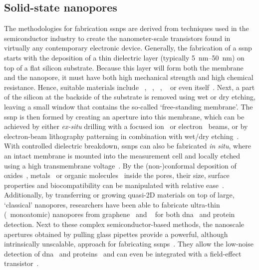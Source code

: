 \subsection{Solid-state nanopores}
%

The methodologies for fabrication \glspl{ssnp} are derived from techniques used in the semiconductor industry
to create the nanometer-scale transistors found in virtually any contemporary electronic device. Generally,
the fabrication of a \gls{ssnp} starts with the deposition of a thin dielectric layer (typically
\SIrange{5}{50}{\nm}) on top of a flat silicon substrate. Because this layer will form both the membrane and
the nanopore, it must have both high mechanical strength and high chemical resistance. Hence, suitable
materials include ~\cite{Li-2001,Storm-2003}, ~\cite{Storm-2005},
~\cite{Venkatesan-2009}, ~\cite{Larkin-2013} or even 
itself~\cite{Malachowski-2013}. Next, a part of the silicon at the backside of the substrate is removed using
wet or dry etching, leaving a small window that contains the so-called `free-standing membrane'. The \gls{ssnp}
is then formed by creating an aperture into this membrane, which can be achieved by either \textit{ex-situ}
drilling with a focused ion~\cite{Li-2001} or electron~\cite{Storm-2003} beams, or by electron-beam
lithography patterning in combination with wet/dry etching~\cite{Nam-2009}. With controlled dielectric
breakdown, \glspl{ssnp} can also be fabricated \textit{in situ}, where an intact membrane is mounted into the
measurement cell and locally etched using a high transmembrane voltage~\cite{Kwok-2014}. By the
(non-)conformal deposition of oxides~\cite{Chen-2004}, metals~\cite{Li-2013d,Auger-2014,Spitzberg-2019} or
organic molecules~\cite{Wanunu-2007,Yusko-2011,Wei-2012,Rotem-2012} inside the pores, their size, surface
properties and biocompatibility can be manipulated with relative ease~\cite{Eggenberger-2019}. Additionally,
by transferring or growing quasi-2D materials on top of large, `classical' nanopores, researchers have been
able to fabricate ultra-thin (\ie~monoatomic) nanopores from graphene~\cite{Fischbein-2008} and
~\cite{Feng-2015b} for both \gls{dna}~\cite{Feng-2015,Merchant-2010,Song-2011} and
protein~\cite{Shan-2013} detection. Next to these complex semiconductor-based methods, the nanoscale apertures
obtained by pulling glass pipettes provide a powerful, although intrinsically unscalable, approach for
fabricating \glspl{ssnp}~\cite{Wang-2006}. They allow the low-noise detection of
\gls{dna}~\cite{Steinbock-2013} and proteins~\cite{Li-2013B} and can even be integrated with a field-effect
transistor~\cite{Ren-2020}.


